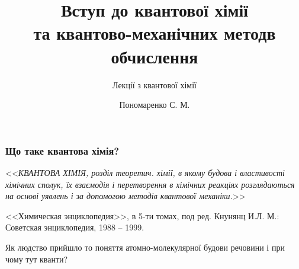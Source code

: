 \documentclass[10pt]{beamer}
\title[Лекції з квантової хімії]{\huge\bfseries Вступ до квантової хімії\\ та квантово-механічних методв обчислення}
\subtitle{Лекції з квантової хімії}
\author{Пономаренко С. М.}
\date{}
\begin{document}
\begin{frame}
	\titlepage
\end{frame}

\begin{frame}
	\frametitle{Що таке квантова хімія?}

\begin{block}{}\justifying
    	<<\emph{КВАНТОВА ХІМІЯ, розділ теоретич. хімії, в якому \alert{будова} і \alert{властивості хімічних сполук}, їх взаємодія і перетворення в хімічних реакціях розглядаються на основі уявлень і за допомогою методів квантової механіки.}>>

    \bigskip

	{\small <<Химическая энциклопедия>>, в 5-ти томах, под ред. Кнунянц И.Л. М.: Советская энциклопедия, 1988 -- 1999.}
\end{block}

\begin{alertblock}{}\centering
    Як людство прийшло то поняття атомно-молекулярної будови речовини і при чому тут кванти?
\end{alertblock}

\end{frame}


\end{document}
